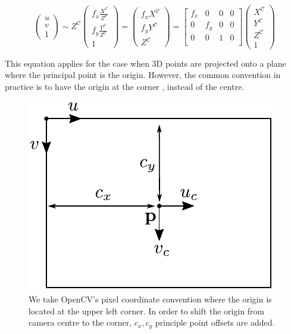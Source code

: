 \documentclass[a4paper]{report}
\numberwithin{figure}{section}
\begin{document}
\begin{equation}
  \begin{pmatrix}
    u\\
    v\\
    1
  \end{pmatrix}
  \sim
  Z^{\mathcal{C}}
  \begin{pmatrix}
    f_x\frac{X^{\mathcal{C}}}{Z^{\mathcal{C}}}\\
    f_y\frac{Y^{\mathcal{C}}}{Z^{\mathcal{C}}}\\
    1
  \end{pmatrix}
  =
  \begin{pmatrix}
    f_xX^{\mathcal{C}}\\
    f_yY^{\mathcal{C}}\\
    Z^{\mathcal{C}}
  \end{pmatrix}
  =
  \begin{bmatrix}
    f_x & 0 & 0 & 0\\
    0 & f_y & 0 & 0\\
    0 & 0 & 1 & 0\\
  \end{bmatrix}
  \begin{pmatrix}
    X^{\mathcal{C}}\\
    Y^{\mathcal{C}}\\
    Z^{\mathcal{C}}\\
    1
  \end{pmatrix}
\end{equation} \label{eq:proj_func_w_f}

This equation applies for the case when 3D points are projected onto a plane 
where the principal point is the origin.  However, the common convention in 
practice is to have the origin at the corner \parencite{RichardHartley2003}, 
instead of the centre.

\begin{figure}[H]
	\centering
  \includegraphics[width=0.4\linewidth,natwidth=640,natheight=640]
  {fig/drawings/pinhole_cam_offset.pdf}
	\caption[Principle Point Offset]{We take OpenCV's pixel coordinate 
	convention where the origin is located at the upper left corner. In order 
	to shift the origin from camera centre to the corner, $c_x, c_y$ principle 
	point offsets are added.}
	\label{fig:pinhole_offset}
\end{figure}
\end{document}
